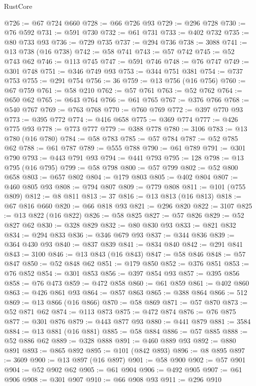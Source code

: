 \begin{lexlean}{RustCore}
\begin{coremodule}
@726 := @67 @724 @660
@728 := @66 @726 @93
@729 := @296 @728
@730 := @76 @592
@731 := @591 @730
@732 := @61 @731
@733 := @402 @732
@735 := @80 @733 @93
@736 := @729 @735
@737 := @294 @736
@738 := 3088
@741 := @13 @738 (@16 @738)
@742 := @58 @741
@743 := @57 @742
@745 := @52 @743 @62
@746 := @113 @745
@747 := @591 @746
@748 := @76 @747
@749 := @301 @748
@751 := @346 @749 @93
@753 := @344 @751 @381
@754 := @737 @753
@755 := @291 @754
@756 := 36
@759 := @13 @756 (@16 @756)
@760 := @67 @759
@761 := @58 @210
@762 := @57 @761
@763 := @52 @762
@764 := @650 @62
@765 := @643 @764
@766 := @61 @765
@767 := @376 @766
@768 := @540 @767
@769 := @763 @768
@770 := @760 @769
@772 := @397 @770 @93
@773 := @395 @772
@774 := @416 @658
@775 := @369 @774
@777 := @426 @775 @93
@778 := @773 @777
@779 := @388 @778
@780 := 3106
@783 := @13 @780 (@16 @780)
@784 := @58 @783
@785 := @57 @784
@787 := @52 @785 @62
@788 := @61 @787
@789 := @555 @788
@790 := @61 @789
@791 := @301 @790
@793 := @443 @791 @93
@794 := @441 @793
@795 := 128
@798 := @13 @795 (@16 @795)
@799 := @58 @798
@800 := @57 @799
@802 := @52 @800 @658
@803 := @657 @802
@804 := @179 @803
@805 := @402 @804
@807 := @460 @805 @93
@808 := @794 @807
@809 := @779 @808
@811 := @101 (@755 @809)
@812 := @8 @811
@813 := 37
@816 := @13 @813 (@16 @813)
@818 := @67 @816 @660
@820 := @66 @818 @93
@821 := @296 @820
@822 := 3107
@825 := @13 @822 (@16 @822)
@826 := @58 @825
@827 := @57 @826
@829 := @52 @827 @62
@830 := @328 @829
@832 := @80 @830 @93
@833 := @821 @832
@834 := @294 @833
@836 := @346 @679 @93
@837 := @344 @836
@839 := @364 @430 @93
@840 := @837 @839
@841 := @834 @840
@842 := @291 @841
@843 := 3100
@846 := @13 @843 (@16 @843)
@847 := @58 @846
@848 := @57 @847
@850 := @52 @848 @62
@851 := @179 @850
@852 := @376 @851
@853 := @76 @852
@854 := @301 @853
@856 := @397 @854 @93
@857 := @395 @856
@858 := @76 @473
@859 := @472 @858
@860 := @61 @859
@861 := @402 @860
@863 := @426 @861 @93
@864 := @857 @863
@865 := @388 @864
@866 := 512
@869 := @13 @866 (@16 @866)
@870 := @58 @869
@871 := @57 @870
@873 := @52 @871 @62
@874 := @113 @873
@875 := @472 @874
@876 := @76 @875
@877 := @301 @876
@879 := @443 @877 @93
@880 := @441 @879
@881 := 3584
@884 := @13 @881 (@16 @881)
@885 := @58 @884
@886 := @57 @885
@888 := @52 @886 @62
@889 := @328 @888
@891 := @460 @889 @93
@892 := @880 @891
@893 := @865 @892
@895 := @101 (@842 @893)
@896 := @8 @895
@897 := 3609
@900 := @13 @897 (@16 @897)
@901 := @58 @900
@902 := @57 @901
@904 := @52 @902 @62
@905 := @61 @904
@906 := @492 @905
@907 := @61 @906
@908 := @301 @907
@910 := @66 @908 @93
@911 := @296 @910

\end{coremodule}
\end{lexlean}

